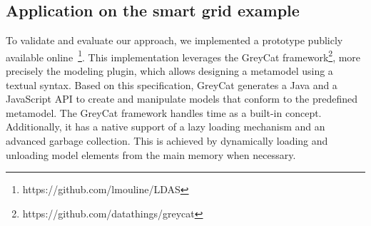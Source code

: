 \subsection{Application on the smart grid example}
\label{subsec:tuto}
%
%
%
To validate and evaluate our approach, we implemented a prototype publicly available online~\footnote{https://github.com/lmouline/LDAS}.
This implementation leverages the GreyCat framework\footnote{https://github.com/datathings/greycat}, more precisely the modeling plugin, which allows designing a metamodel using a textual syntax. Based on this specification, GreyCat generates a Java and a JavaScript API to create and manipulate models that conform to the predefined metamodel. The GreyCat framework handles time as a built-in concept. Additionally, it has a native support of a lazy loading mechanism and an advanced garbage collection. This is achieved by dynamically loading and unloading model elements from the main memory when necessary.

